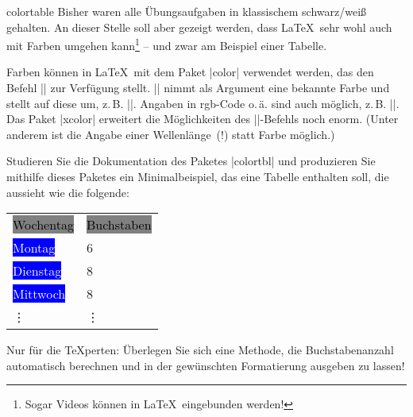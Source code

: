 \documentclass[
	solution,
	blatt=5,
	ausgabe=14.\,05.\,2010,
	rückgabe=21.\,05.\,2010
]{lcourse-hd}
\begin{document}
\begin{exercise}[
  name={Tabellen – in Farbe!},
  punkte=5,
  abgabe = Quellcode per Mail{,} Quellcode und fertiges Dokument (schwarz-weiß) ausgedruckt.]{colortable}
Bisher waren alle Übungsaufgaben in klassischem schwarz/weiß gehalten. An dieser Stelle soll aber gezeigt werden, dass \LaTeX\ sehr wohl auch mit Farben umgehen kann\footnote{Sogar Videos können in \LaTeX\ eingebunden werden!} – und zwar am Beispiel einer Tabelle.

Farben können in \LaTeX\ mit dem Paket |color| verwendet werden, das den Befehl |\color{}| zur Verfügung stellt. |\color{}| nimmt als Argument eine bekannte Farbe und stellt auf diese um, z.\,B. |\color{blue}|. Angaben in rgb-Code o.\,ä. sind auch möglich, z.\,B. |\color[gray]{0.8}|. Das Paket |xcolor| erweitert die Möglichkeiten des |\color|-Befehls noch enorm. (Unter anderem ist die Angabe einer Wellenlänge~(!) statt Farbe möglich.)

Studieren Sie die Dokumentation des Paketes |colortbl| und produzieren Sie mithilfe dieses Paketes ein Minimalbeispiel, das eine Tabelle enthalten soll, die aussieht wie die folgende: %
\par
\centering
\begin{tabular}{l!{\hspace*{-4.3mm}}l}
\colorbox{gray}{\textcolor{black}{Wochentag}} & \colorbox{gray}{\textcolor{black}{Buchstaben\vphantom{Wg}}}\\
\colorbox{blue}{\textcolor{white}{Montag\hspace*{.8em}}} & 6 \\
\colorbox{blue}{\textcolor{white}{Dienstag\hspace*{.34em}}} & 8\\
\colorbox{blue}{\textcolor{white}{Mittwoch}} &  8\\
\vdots & \vdots \\
\end{tabular}
Nur für die \TeX perten: Überlegen Sie sich eine Methode, die Buchstabenanzahl automatisch berechnen und in der gewünschten Formatierung ausgeben zu lassen!
\end{exercise}
\end{document}
